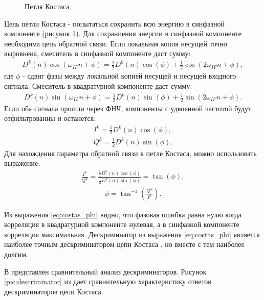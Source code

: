 \begin{figure}[h]
\begin{center}
\end{center}
\caption{Петля Костаса}
\label{pic:costas}
\end{figure}

Цель петли Костаса - попытаться сохранить всю энергию в синфазной компоненте (рисунок \ref{pic:costas}). Для сохраниения энергии
в синфазной
компоненте необходима цепь обратной связи. Если локальная копия несущей точно выровнена, смеситель в 
синфазной компоненте даст сумму:
\begin{eqnarray}
D^k(n)\cos(\omega_{IF}n + \phi) = \frac{1}{2}D^k(n)\cos(\phi) + \frac{1}{2}\cos(2\omega_{IF}n + \phi),
\label{eq:costas_i}
\end{eqnarray}
где ${\phi}$ - сдвиг фазы между локальной копией несущей и несущей входного сигнала. Смеситель в квадратурной
компоненте даст сумму:
\begin{eqnarray}
D^k(n)\sin(\omega_{IF}n + \phi) = \frac{1}{2}D^k(n)\sin(\phi) + \frac{1}{2}\sin(2\omega_{IF}n + \phi).
\label{eq:costas_q}
\end{eqnarray}
Если оба сигнала прошли через ФНЧ, компоненты с удвоенной частотой будут отфильтрованны и останется:
\begin{eqnarray}
I^k = \frac{1}{2}D^k(n)\cos(\phi), \\
Q^k = \frac{1}{2}D^k(n)\sin(\phi).
\label{eq:costas_iq}
\end{eqnarray}
Для нахождения параметра обратной связи в петле Костаса, можно использовать выражение:
\begin{eqnarray}
\frac{I^k}{Q^k} = \frac{\frac{1}{2}D^k(n)\cos(\phi)}{\frac{1}{2}D^k(n)\sin(\phi)} = \tan(\phi),
\label{eq:costas_descr}
\end{eqnarray}
\begin{eqnarray}
\phi = \tan^{-1}({\frac{Q^k}{I^k}}).
\label{eq:costas_phi}
\end{eqnarray}

Из выражения \ref{eq:costas_phi} видно, что фазовая ошибка равна нулю когда корреляция в квадратурной
компоненте нулевая, а в синфазной компоненте корреляция максимальная. Дескриминатор из выражения \ref{eq:costas_phi}
является наиболее точным дескриминатором цепи Костаса \cite{gps}, но вместе с тем наиболее долгим.

В \cite{gps} представлен сравнительный анализ дескриминаторов. Рисунок \ref{pic:descriminator} из \cite{gps} дает сравнительную
характеристику ответов дескриминаторов цепи Костаса.

